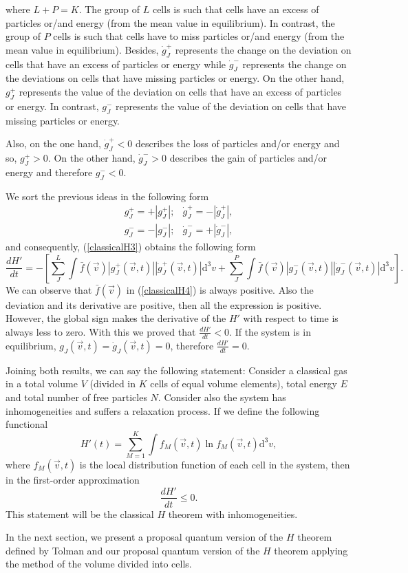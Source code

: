 %
where $L+P=K$. The group of $L$ cells is such that cells have an excess of
particles or/and energy (from the mean value in equilibrium). In contrast,
the group of $P$ cells is such that cells have to miss particles or/and energy
(from the mean value in equilibrium). Besides, $\dot{g}^{+}_{J}$ represents the
change on the deviation on cells that have an excess of particles or energy
while $\dot{g}^{-}_{J}$  represents the change on the deviations on cells that
have missing particles or energy. 
On the other hand, $g^{+}_{J}$  represents the value of the deviation on cells
that have an excess of particles or energy. In contrast, $g^{-}_{J}$ represents
the value of the deviation on cells that have missing particles or energy.

Also, on the one hand, $\dot{g}^{+}_{J}<0$ describes the loss of particles
and/or energy and so, $g^{+}_{J}>0$. On the other hand, $\dot{g}^{-}_{J}>0$
describes the gain of particles and/or energy and therefore $g^{-}_{J}<0$. 

We sort the previous ideas in the following form
%
\begin{equation}\label{separacionclassical}
\begin{array}{rl}
  g^{+}_{J}=+|g^{+}_{J}|; & \dot{g}^{+}_{J}=-|\dot{g}^{+}_{J}|,\\
  g^{-}_{J}=-|g^{-}_{J}|; & \dot{g}^{-}_{J}=+|\dot{g}^{-}_{J}|,
 \end{array}
\end{equation}
%
and consequently, (\ref{classicalH3}) obtains the following form
%
\begin{equation}
    \frac{dH'}{dt}=-\left[
      \sum_J^{L}\int\bar f(\vec{v})|g_J^{+}(\vec{v},t)|
        |\dot g_J^{+}(\vec{v},t)|\mathrm{d}^3v
      +\sum_J^{P}\int\bar f(\vec{v})|g_J^{-}(\vec{v},t)|
      |\dot g_J^{-}(\vec{v},t)|\mathrm{d}^3v 
    \right]. \label{classicalH4}
\end{equation}
%
We can observe that $\bar{f}(\vec{v})$ in (\ref{classicalH4}) is always
positive. Also the deviation and its derivative are positive, then all the
expression is positive. However, the global sign makes the derivative of the
$H'$ with respect to time is always less to zero. With this we proved that
$\frac{dH'}{dt}<0$. If the system is in equilibrium,
$g_{J}(\vec{v},t)=\dot g_J(\vec{v},t)=0$, therefore $\frac{dH'}{dt}=0$.

Joining both results, we can say the following statement:
Consider a classical gas in a total volume $V$ (divided in $K$ cells of equal
volume elements), total energy $E$ and total number of free particles $N$.
Consider also the system has inhomogeneities and suffers a relaxation process.
If we define the following functional
%
\begin{equation}\label{CH3}
   H'(t)=\sum_{M=1}^{K}\int f_M(\vec{v},t) \ln f_M(\vec{v},t)\mathrm{d}^3v,
\end{equation}
%
where $f_M(\vec{v},t)$ is the local distribution function of each cell in the
system, then in the first-order approximation
%
\begin{equation}
    \frac{dH'}{dt} \leq 0.
\end{equation}
%
This statement will be the classical $H$ theorem with inhomogeneities.

In the next section, we present a proposal quantum version of the
$H$ theorem defined by Tolman and our proposal quantum version of the $H$
theorem applying the method of the volume divided into cells.


